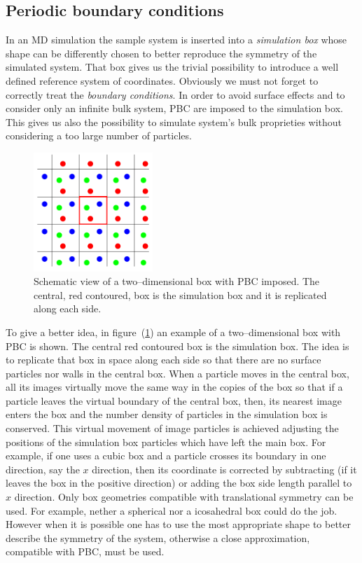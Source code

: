 \subsection{Periodic boundary conditions}
In an \ac{MD} simulation the sample system is inserted into a \textit{simulation box} whose shape can be
differently chosen to better reproduce the symmetry of the simulated system. That box gives us the trivial
possibility to introduce a well defined reference system of coordinates. Obviously we must not forget to
correctly treat the \textit{boundary conditions}. In order to avoid surface effects and to consider only an
infinite bulk system, \ac{PBC} are imposed to the simulation box. This gives us also the possibility to simulate
system's bulk proprieties without considering a too large number of particles.
\begin{figure}
	\includegraphics[width=0.4\textwidth]{./img/PBCScheme/PBCScheme}
	\caption{Schematic view of a two--dimensional box with \acs{PBC} imposed. The central, red contoured, box is the simulation box and it is replicated along each side.}%
	\label{fig:pbc}
\end{figure}
To give a better idea, in figure~(\ref{fig:pbc}) an example of a two--dimensional box with \ac{PBC} is shown. The
central red contoured box is the simulation box. The idea is to replicate that box in space along each side so
that there are no surface particles nor walls in the central box. When a particle moves in the central box, all
its images virtually move the same way in the copies of the box so that if a particle leaves the virtual boundary
of the central box, then, its nearest image enters the box and the number density of particles in the simulation
box is conserved. This virtual movement of image particles is achieved adjusting the positions of the simulation
box particles which have left the main box. For example, if one uses a cubic box and a particle crosses its
boundary in one direction, say the $x$ direction, then its coordinate is corrected by subtracting (if it leaves
the box in the positive direction) or adding the box side length parallel to $x$ direction. Only box geometries
compatible with translational symmetry can be used. For example, nether a spherical nor a icosahedral box could
do the job. However when it is possible one has to use the most appropriate shape to better describe the
symmetry of the system, otherwise a close approximation, compatible with \ac{PBC}, must be used.

